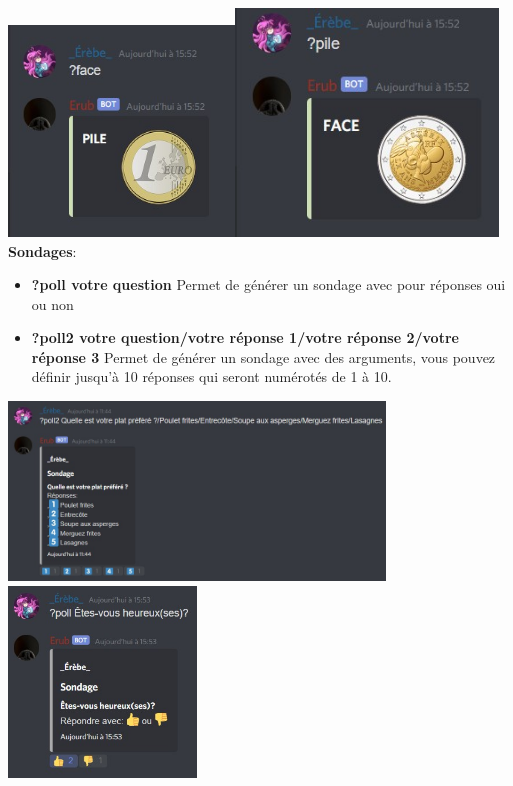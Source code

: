     \includegraphics[width=6cm]{img/face2.jpg}\includegraphics[width=7cm]{img/pile.jpg}
    \newpage
{\bf Sondages}: 
    \begin{itemize}
        \item {\bf ?poll votre question} Permet de générer un sondage avec pour réponses  oui ou non

        \item {\bf ?poll2 votre question/votre réponse 1/votre réponse 2/votre réponse 3} Permet de générer un sondage avec des arguments, vous pouvez définir jusqu'à 10 réponses qui seront numérotés de 1 à 10.
        
    \end{itemize}
    \includegraphics[width=10cm]{img/poll2.jpg} \includegraphics[width=5cm]{img/poll.jpg}
    
